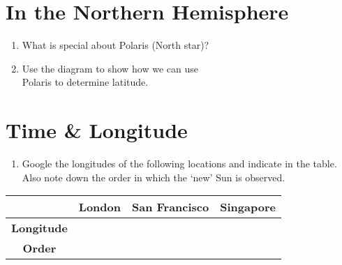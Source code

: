 \section{In the Northern Hemisphere}
\begin{minipage}{0.45\linewidth}
	\begin{enumerate}[\style (1)]\resume
		\item What is special about Polaris (North star)?\brk
		\item Use the diagram to show how we can use\\ Polaris to determine latitude.
	\end{enumerate}\save
	
	\bigskip
	\section{Time \& Longitude}
	\begin{enumerate}[\style (1)]\resume
		\item Google the longitudes of the following locations and indicate in the table. Also note down the order in which the `new' Sun is observed.
	\end{enumerate}\save
	{
		\renewcommand{\arraystretch}{1.5}
		\begin{tabular}{>{\bfseries}c|*3{C{.275\linewidth}|}}
			& London & San Francisco & Singapore \\
			\toprule
			Longitude & & & \\ \midrule
			Order & & & \\
			\bottomrule
		\end{tabular}
	}
\end{minipage}
\begin{minipage}{0.4\linewidth}
	\globe
\end{minipage}

\bigskip 

